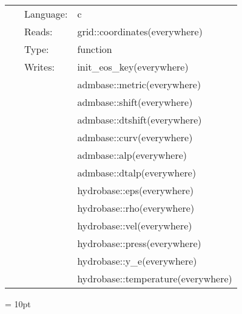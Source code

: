  \begin{tabular*}{160mm}{cll} 
~ & Language:  & c \\ 
~ & Reads:  & grid::coordinates(everywhere) \\ 
~ & Type:  & function \\ 
~ & Writes:  & init\_eos\_key(everywhere) \\ 
~& ~ &admbase::metric(everywhere)\\ 
~& ~ &admbase::shift(everywhere)\\ 
~& ~ &admbase::dtshift(everywhere)\\ 
~& ~ &admbase::curv(everywhere)\\ 
~& ~ &admbase::alp(everywhere)\\ 
~& ~ &admbase::dtalp(everywhere)\\ 
~& ~ &hydrobase::eps(everywhere)\\ 
~& ~ &hydrobase::rho(everywhere)\\ 
~& ~ &hydrobase::vel(everywhere)\\ 
~& ~ &hydrobase::press(everywhere)\\ 
~& ~ &hydrobase::y\_e(everywhere)\\ 
~& ~ &hydrobase::temperature(everywhere)\\ 
\end{tabular*} 



\vspace{5mm}\parskip = 10pt 
